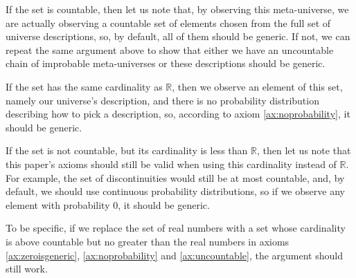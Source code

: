 \documentclass[a4paper
,draft
]{article}
\def\reale{\mathbb{R}}
\newcommand{\ghilimele}[1]{``#1"}
\begin{document}
If the set is countable, then let us note that, by observing this meta-universe,
we are actually observing a countable set of elements chosen from the full
set of universe descriptions, so, by default, all of them should be generic.
If not, we can repeat the same argument above to show that either we have
an uncountable chain of improbable meta-universes or these descriptions should be
generic.

If the set has the same cardinality as $\reale$,
then we observe an element of this set, namely our universe's description, and there
is no probability distribution describing how to pick a description, so,
according to axiom \ref{ax:noprobability}, it should be generic.

If the set is not countable, but its cardinality is less than $\reale$, then
let us note that this paper's axioms should still be valid when using this
cardinality instead of $\reale$.
For example, the set of discontinuities would still be at most countable,
and, by default, we should use continuous probability distributions, so
if we observe any element with probability $0$, it should be generic.

To be specific, if we replace the set of real numbers with a set whose
cardinality is above countable but no greater than the real numbers
in axioms \ref{ax:zeroisgeneric}, \ref{ax:noprobability} and
\ref{ax:uncountable}, the argument should still work.



\end{document}
